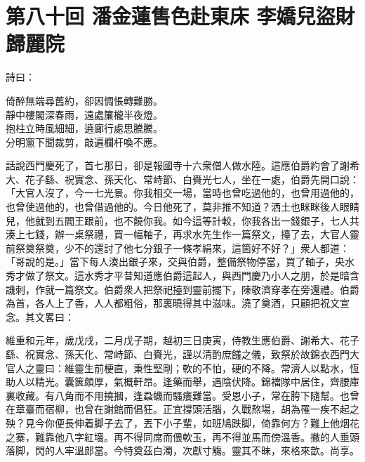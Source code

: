 
\chapter*{第八十回 潘金蓮售色赴東床 李嬌兒盜財歸麗院}


詩曰：

\begin{myquote} 
倚醉無端尋舊約，卻因惆悵轉難勝。\\靜中樓閣深春雨，遠處簾櫳半夜燈。\\抱柱立時風細細，遶廊行處思騰騰。\\分明窻下聞裁剪，敲遍欄杆喚不應。
\end{myquote} 

話說西門慶死了，首七那日，卻是報國寺十六衆僧人做水陸。這應伯爵約會了謝希大、花子繇、祝實念、孫天化、常峙節、白賚光七人，坐在一處，伯爵先開口說：「大官人沒了，今一七光景。你我相交一場，當時也曾吃過他的，也曾用過他的，也曾使過他的，也曾借過他的。今日他死了，莫非推不知道？{}洒土也眯眯後人眼睛兒，他就到五閻王跟前，也不饒你我。{}如今這等計較，你我各出一錢銀子，七人共湊上七錢，辦一桌祭禮，買一幅軸子，再求水先生作一篇祭文，擡了去，大官人靈前祭奠祭奠，少不的還討了他七分銀子一條孝絹來，這箇好不好？」衆人都道：「哥說的是。」當下每人湊出銀子來，交與伯爵，整備祭物停當，買了軸子，央水秀才做了祭文。這水秀才平昔知道應伯爵這起人，與西門慶乃小人之朋，於是暗含譏刺，作就一篇祭文。伯爵衆人把祭祀擡到靈前擺下，陳敬濟穿孝在旁還禮。伯爵為首，各人上了香，人人都粗俗，那裏曉得其中滋味。澆了奠酒，只顧把祝文宣念。其文畧曰：

\begin{myquote}[\markfont]
維重和元年，歲戊戌，二月戊子期，越初三日庚寅，侍教生應伯爵、謝希大、花子繇、祝實念、孫天化、常峙節、白賚光，謹以清酌庶饈之儀，致祭於故錦衣西門大官人之靈曰：維靈生前梗直，秉性堅剛；軟的不怕，硬的不降。常濟人以點水，恆助人以精光。囊篋頗厚，氣概軒昂。逢藥而舉，遇陰伏降。錦襠隊中居住，齊腰庫裏收藏。有八角而不用撓摑，逢蝨蟣而騷癢難當。受恩小子，常在胯下隨幫。也曾在章臺而宿柳，也曾在謝館而倡狂。正宜撐頭活腦，久戰熬場，胡為罹一疾不起之殃？見今你便長伸着脚子去了，丟下小子輩，如班鳩跌脚，倚靠何方？難上他烟花之寨，難靠他八字紅墻。再不得同席而偎軟玉，再不得並馬而傍溫香。撇的人垂頭落脚，閃的人牢溫郎當。今特奠茲白濁，次獻寸觴。靈其不昧，來格來歆。尚享。{}
\end{myquote} 

